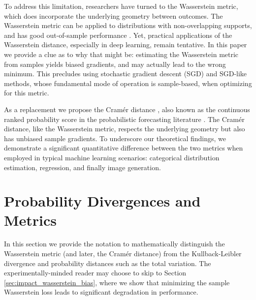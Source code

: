\documentclass{article}
\begin{document}
To address this limitation, researchers have turned to the Wasserstein metric, which does incorporate the underlying geometry between outcomes. The Wasserstein metric can be applied to distributions with non-overlapping supports, and has good out-of-sample performance \citep{esfahani2015data}. Yet, practical applications of the Wasserstein distance, especially in deep learning, remain tentative. In this paper we provide a clue as to why that might be: estimating the Wasserstein metric from samples yields biased gradients, and may actually lead to the wrong minimum. This precludes using stochastic gradient descent (SGD) and SGD-like methods, whose fundamental mode of operation is sample-based, when optimizing for this metric.
%

%

%
%
%
%
%

As a replacement we propose the Cram\'er distance \citep{szekely02estatistics, rizzo2016energy}, also known as the continuous ranked probability score in the probabilistic forecasting literature \citep{gneiting07strictly}. The Cram\'er distance, like the Wasserstein metric, respects the underlying geometry but also has unbiased sample gradients. To underscore our theoretical findings, we demonstrate a significant quantitative difference between the two metrics when employed in typical machine learning scenarios: categorical distribution estimation, regression, and finally image generation.

\section{Probability Divergences and Metrics}

In this section we provide the notation to mathematically distinguish the Wasserstein metric (and later, the Cram\'er distance) from the Kullback-Leibler divergence and probability distances such as the total variation. 
The experimentally-minded reader may choose to skip to Section \ref{sec:impact_wasserstein_bias}, where we show that minimizing the sample Wasserstein loss leads to significant degradation in performance.
\end{document}
